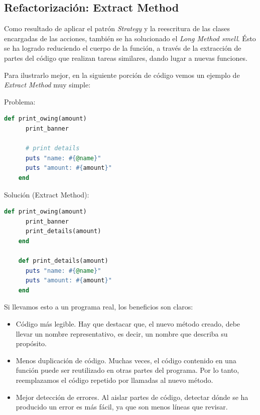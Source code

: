 \subsection{Refactorización: Extract Method}
\label{2.2.3}

Como resultado de aplicar el patrón {\it Strategy} y la reescritura de las clases encargadas de las acciones, también se ha solucionado el {\it Long Method smell}. Ésto se ha logrado reduciendo el cuerpo de la función, a través de la extracción de partes del código que realizan tareas similares,
dando lugar a nuevas funciones.
\bigskip

Para ilustrarlo mejor, en la siguiente porción de código vemos un ejemplo de {\it Extract Method} \cite{Fowler:1999} muy simple:
\bigskip 

\begin{minipage}[t]{0.45\linewidth}
  Problema:
  \begin{lstlisting}[language=Ruby]
    def print_owing(amount)
      print_banner

      # print details
      puts "name: #{@name}"
      puts "amount: #{amount}"
    end
  \end{lstlisting}
\end{minipage}
\begin{minipage}[t]{0.5\linewidth}
    Solución (Extract Method):
  \begin{lstlisting}[language=Ruby]
    def print_owing(amount)
      print_banner
      print_details(amount)
    end

    def print_details(amount)
      puts "name: #{@name}"
      puts "amount: #{amount}"
    end
  \end{lstlisting}
\end{minipage}
\bigskip

Si llevamos esto a un programa real, los beneficios son claros:
\begin{itemize}
  \item Código más legible. Hay que destacar que, el nuevo método creado, debe llevar un nombre representativo, es decir, un nombre que describa su propósito.
  \item Menos duplicación de código. Muchas veces, el código contenido en una función puede ser reutilizado en otras partes del programa. Por lo tanto, reemplazamos el código repetido por llamadas al nuevo método.
  \item Mejor detección de errores. Al aislar partes de código, detectar dónde se ha producido un error es más fácil, ya que son menos líneas que revisar.
\end{itemize}


